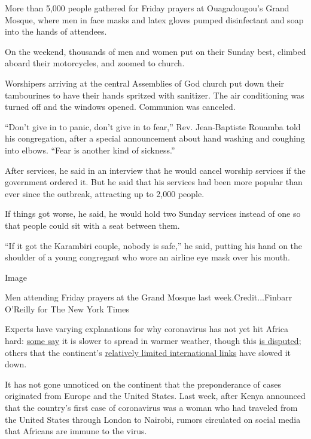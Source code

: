 More than 5,000 people gathered for Friday prayers at Ouagadougou's
Grand Mosque, where men in face masks and latex gloves pumped
disinfectant and soap into the hands of attendees.

On the weekend, thousands of men and women put on their Sunday best,
climbed aboard their motorcycles, and zoomed to church.

Worshipers arriving at the central Assemblies of God church put down
their tambourines to have their hands spritzed with sanitizer. The air
conditioning was turned off and the windows opened. Communion was
canceled.

``Don't give in to panic, don't give in to fear,'' Rev. Jean-Baptiste
Rouamba told his congregation, after a special announcement about hand
washing and coughing into elbows. ``Fear is another kind of sickness.''

After services, he said in an interview that he would cancel worship
services if the government ordered it. But he said that his services had
been more popular than ever since the outbreak, attracting up to 2,000
people.

If things got worse, he said, he would hold two Sunday services instead
of one so that people could sit with a seat between them.

``If it got the Karambiri couple, nobody is safe,'' he said, putting his
hand on the shoulder of a young congregant who wore an airline eye mask
over his mouth.

Image

Men attending Friday prayers at the Grand Mosque last
week.Credit...Finbarr O'Reilly for The New York Times

Experts have varying explanations for why coronavirus has not yet hit
Africa hard:
\href{https://papers.ssrn.com/sol3/papers.cfm?abstract_id=3551767}{some
say} it is slower to spread in warmer weather, though this
\href{https://www.nytimes.com/reuters/2020/03/16/world/asia/16reuters-health-coronavirus-southeast-asia.html}{is
disputed}; others that the continent's
\href{https://www.theafricareport.com/24160/covid-19-is-only-slowly-reaching-africa-thats-no-surprise/}{relatively
limited international links} have slowed it down.

It has not gone unnoticed on the continent that the preponderance of
cases originated from Europe and the United States. Last week, after
Kenya announced that the country's first case of coronavirus was a woman
who had traveled from the United States through London to Nairobi,
rumors circulated on social media that Africans are immune to the virus.

